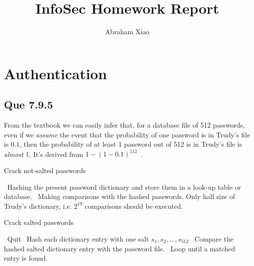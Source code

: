\documentclass{article}
\begin{document}
\title{InfoSec Homework Report}
\author{Abraham Xiao}
\maketitle

\section{Authentication}
\label{sec:authentication}

\subsection{Que 7.9.5}
From the textbook we can easily infer that, for a database file of 512
passwords, even if we \emph{assume} the event that the probability of
one password is in Trudy's file is $0.1$, then the probability of at
least 1 password out of 512 is in Trudy's file is \emph{almost}
$1$. It's derived from $1-{(1-0.1)}^{512}$~\cite{Ref:InfoSecTextbook}.
\label{sec:que-7.9.5}
\begin{algorithm}
  \caption{Crack not-salted passwords}
\label{sec:que-7.9.5-2:algo:crack-passwords-1}
\begin{algorithmic}[1]
  \STATE~Hashing the present password dictionary and store them in a
  look-up table or database.
  \STATE~Making comparisons with the hashed passwords. Only half size
  of Trudy's dictionary, i.e. $2^{19}$ comparisons should be executed.
\end{algorithmic}
\end{algorithm}

\begin{algorithm}
  \caption{Crack salted passwords}
\label{sec:que-7.9.5-3:algo:crack-passwords-2}
\begin{algorithmic}
  \STATE~Quit
  \ELSE%
  \STATE~Hash each dictionary entry with one salt
  $s_{1},s_{2},\ldots,s_{512}$ 
  \STATE~Compare the hashed salted dictionary entry with the password
  file.
  \STATE~Loop until a matched entry is found.
  \ENDIF%
\end{algorithmic}
\end{algorithm}
\end{document}
